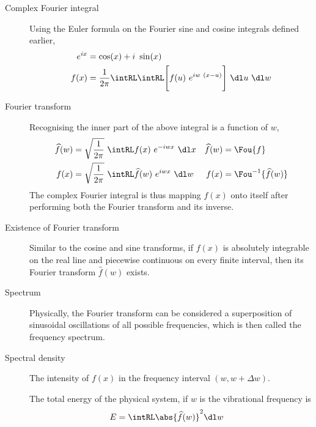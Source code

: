 \begin{description}
    \item[Complex Fourier integral] Using the Euler formula on the Fourier sine and
        cosine integrals defined earlier,
        \begin{align}
            e^{ix} & = \cos(x) + i\ \sin(x)                                             \\
            f(x)   & = \frac{1}{2\pi} \intRL \intRL \Bigg[ f(u)\ e^{iw\ (x - u)} \Bigg]
            \ \dl u\ \dl w
        \end{align}

    \item[Fourier transform] Recognising the inner part of the above integral is
        a function of $ w $,
        \begin{align}
            \widehat{f}(w)   & = \sqrt{\frac{1}{2\pi}}\ \intRL f(x)\ e^{-iwx}
            \ \dl x          &
            \widehat{f}(w)   & = \Fou \{f\}                                   \\
            f(x)             & = \sqrt{\frac{1}{2\pi}}\ \intRL \widehat{f}(w)
            \ e^{iwx}\ \dl w &
            f(x)             & = \Fou^{-1}\{\widehat{f}(w)\}
        \end{align}
        The complex Fourier integral is thus mapping $ f(x) $ onto itself after
        performing both the Fourier transform and its inverse.

    \item[Existence of Fourier transform] Similar to the cosine and sine transforms,
        if $ f(x) $ is absolutely integrable on the real line and piecewise continuous on
        every finite interval, then its Fourier transform $ \widehat{f}(w) $ exists.

    \item[Spectrum] Physically, the Fourier transform can be considered a superposition
        of sinusoidal oscillations of all possible frequencies, which is then called
        the frequency spectrum. \par

    \item[Spectral density] The intensity of $ f(x) $ in the frequency interval
        $ (w, w + \Delta w) $. \par
        The total energy of the physical system, if $ w $ is the vibrational frequency
        is
        \begin{align}
            E & = \intRL \abs{\widehat{f}(w)}^2 \dl w
        \end{align}


\end{description}
